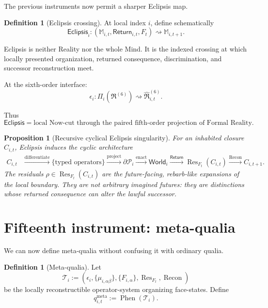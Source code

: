 \documentclass[10pt]{article}
\theoremstyle{pe}
\newtheorem{proposition}[theorem]{Proposition}
\theoremstyle{definition}
\newtheorem{definition}[theorem]{Definition}
\newcommand{\Res}{\operatorname{Res}}
\newcommand{\Recon}{\operatorname{Recon}}
\newcommand{\Phen}{\operatorname{Phen}}
\newcommand{\World}{\mathsf{World}}
\newcommand{\Return}{\mathsf{Return}}
\newcommand{\Eclipsis}{\mathsf{Eclipsis}}
\begin{document}
The previous instruments now permit a sharper Eclipsis map.

\begin{definition}[Eclipsis crossing]
At local index \(i\), define schematically
\begin{equation}\label{eq:eclipsis-crossing}
  \boxed{
  \Eclipsis_i:
  (\mathbb M_{i,t},\Return_{i,t},F_t)
  \rightsquigarrow
  \mathbb M_{i,t+1}.
  }
\end{equation}
\end{definition}

Eclipsis is neither Reality nor the whole Mind.  It is the indexed crossing at which locally presented organization, returned consequence, discrimination, and successor reconstruction meet.

At the sixth-order interface:
\[
  \epsilon_i:
  \Pi_i(\mathfrak R^{(6)})
  \rightsquigarrow
  \widehat{\mathfrak R}^{(6)}_{i,t}.
\]

Thus
\[
  \boxed{
  \Eclipsis
  =
  \text{local Now-cut through the paired fifth-order projection of Formal Reality}.
  }
\]

\begin{proposition}[Recursive cyclical Eclipsis singularity]
For an inhabited closure \(C_{i,t}\), Eclipsis induces the cyclic architecture
\begin{equation}\label{eq:eclipsis-cycle}
\boxed{
\begin{aligned}
C_{i,t}
&\xrightarrow{\text{differentiate}}
\{\text{typed operators}\}
\xrightarrow{\text{project}}
\partial\mathcal P_i
\xrightarrow{\text{enact}}
\World_i
\xrightarrow{\Return}
\Res_{F_t}(C_{i,t})
\xrightarrow{\Recon}
C_{i,t+1}.
\end{aligned}}
\end{equation}
The residuals \(\rho\in\Res_{F_t}(C_{i,t})\) are the future-facing, rebarb-like expansions of the local boundary.  They are not arbitrary imagined futures: they are distinctions whose returned consequence can alter the lawful successor.
\end{proposition}

\section{Fifteenth instrument: meta-qualia}

We can now define meta-qualia without confusing it with ordinary qualia.

\begin{definition}[Meta-qualia]
Let
\[
  \mathcal T_i
  :=
  \left(
    \epsilon_i,
    \{\mu_{i,\alpha\beta}\},
    \{F_{i,\alpha}\},
    \Res_{F_t},
    \Recon
  \right)
\]
be the locally reconstructible operator-system organizing face-states.  Define
\begin{equation}\label{eq:metaqualia}
  \boxed{
  q^{\mathrm{meta}}_{i,t}
  :=
  \Phen(\mathcal T_i).
  }
\end{equation}
\end{definition}
\end{document}
